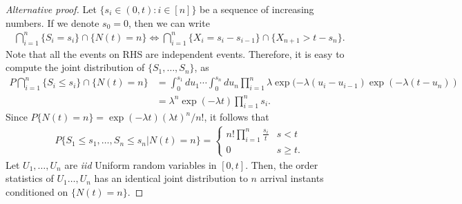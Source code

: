 \documentclass[a4paper,10pt,english]{article}
\begin{document}
\begin{proof}[Alternative proof] Let $\{ s_i \in (0, t) : i \in [n]\}$ be a sequence of increasing numbers. If we denote $s_{0} = 0$, then we can write 
\begin{align*}
\bigcap_{i=1}^n\{S_i = s_i\}\cap\{N(t) = n\} \iff \bigcap_{i=1}^n\{X_i = s_i - s_{i-1}\}\cap\{X_{n+1} > t - s_n\}.
\end{align*}
Note that all the events on RHS are independent events. Therefore, it is easy to compute the joint distribution of $\{S_1,\ldots, S_n\}$, as 
\begin{align*}
P\bigcap_{i=1}^n\{S_i \leq s_i\}\cap\{N(t) = n\} &= \int_{0}^{s_1}du_1\cdots\int_{0}^{s_n}du_n \prod_{i=1}^n\lambda \exp(-\lambda (u_i-u_{i-1})\exp(-\lambda (t-u_n))\\
&= \lambda^n\exp(-\lambda t)\prod_{i=1}^ns_i.
\end{align*}
Since $P\{N(t) = n\} = \exp(-\lambda t)(\lambda t)^n/n! $, it follows that 
\begin{align*}
P\{S_1 \leq s_1,\ldots, S_n\leq s_n | N(t) = n\} = 
\begin{cases}
n!\prod_{i=1}^n\frac{s_i}{t} & s < t\\ 
0 & s \geq t.
\end{cases}
\end{align*}
Let $U_{1},\ldots,U_{n}$ are \emph{iid} Uniform random variables in $[0,t]$. Then, the order statistics  of $U_1 \ldots, U_n$ has an identical joint distribution to $n$ arrival instants conditioned on $\{N(t)=n\}$.\end{proof}
\end{document}
